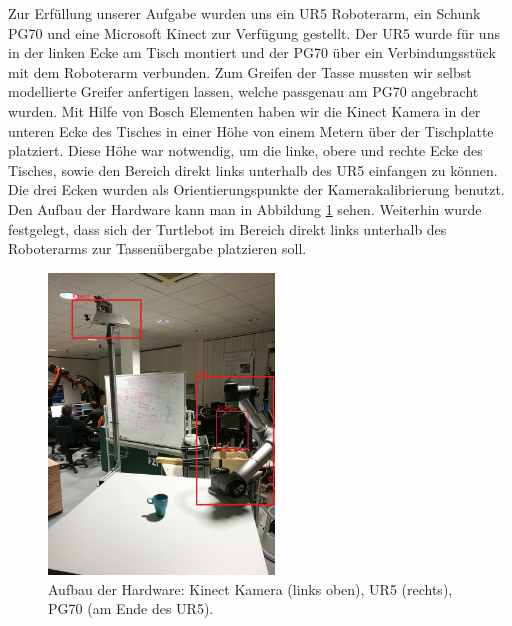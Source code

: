 Zur Erfüllung unserer Aufgabe wurden uns ein UR5 Roboterarm, ein Schunk PG70 und eine Microsoft Kinect zur Verfügung gestellt. Der UR5 wurde für uns in der linken Ecke am Tisch montiert und der PG70 über ein Verbindungsstück mit dem Roboterarm verbunden. Zum Greifen der Tasse mussten wir selbst modellierte Greifer anfertigen lassen, welche passgenau am PG70 angebracht wurden. Mit Hilfe von Bosch Elementen haben wir die Kinect Kamera in der unteren Ecke des Tisches in einer Höhe von einem Metern über der Tischplatte platziert. Diese Höhe war notwendig, um die linke, obere und rechte Ecke des Tisches, sowie den Bereich direkt links unterhalb des UR5 einfangen zu können. Die drei Ecken wurden als Orientierungspunkte der Kamerakalibrierung benutzt. Den Aufbau der Hardware kann man in Abbildung \ref{Hardware} sehen.
\newline
Weiterhin wurde festgelegt, dass sich der Turtlebot im Bereich direkt links unterhalb des Roboterarms zur Tassenübergabe platzieren soll.
\begin{figure}
	\centering
	\includegraphics[height=8cm]{images/Hardware-Aufbau_Beschriftung.jpg}
	\caption{Aufbau der Hardware: Kinect Kamera (links oben), UR5 (rechts), PG70 (am Ende des UR5).}
	\label{Hardware}
\end{figure}

